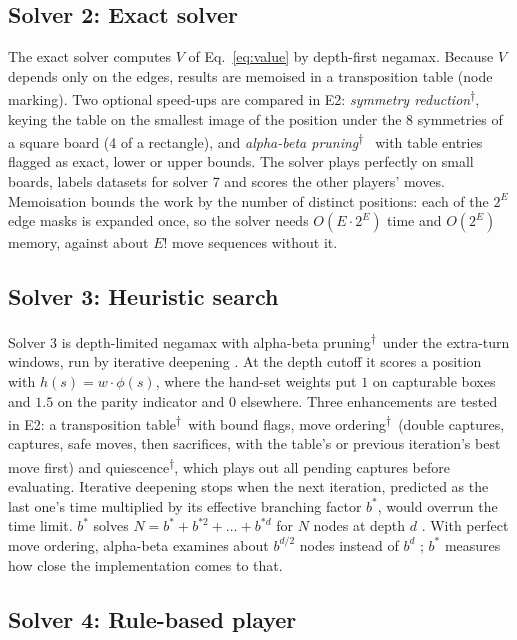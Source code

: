 \documentclass[11pt,a4paper]{article}
\newcommand{\outside}{\textsuperscript{$\dagger$}} %
\begin{document}
\subsection{Solver 2: Exact solver}

The exact solver computes $V$ of Eq.~\eqref{eq:value} by depth-first negamax. Because $V$
depends only on the edges, results are memoised in a transposition table (node marking).
Two optional speed-ups are compared in E2: \emph{symmetry reduction}\outside, keying the
table on the smallest image of the position under the 8 symmetries of a square board (4
of a rectangle), and \emph{alpha-beta pruning}\outside\ \cite{knuth1975alphabeta} with
table entries flagged as exact, lower or upper bounds. The solver plays perfectly on
small boards, labels datasets for solver 7 and scores the other players' moves.
Memoisation bounds the work by the number of distinct positions: each of the $2^E$ edge
masks is expanded once, so the solver needs $O(E\cdot 2^E)$ time and $O(2^E)$ memory,
against about $E!$ move sequences without it.

\subsection{Solver 3: Heuristic search}

Solver 3 is depth-limited negamax with alpha-beta pruning\outside\ under the extra-turn
windows, run by iterative deepening \cite{korf1985iddfs}. At the depth cutoff it scores
a position with $h(s)=w\cdot\phi(s)$, where the hand-set weights put $1$ on capturable
boxes and $1.5$ on the parity indicator and $0$ elsewhere. Three enhancements are tested
in E2: a transposition table\outside\ with bound flags, move ordering\outside\ (double
captures, captures, safe moves, then sacrifices, with the table's or previous
iteration's best move first) and quiescence\outside, which plays out all pending captures
before evaluating. Iterative deepening stops when the next iteration, predicted as the
last one's time multiplied by its effective branching factor $b^*$, would overrun the
time limit. $b^*$ solves $N=b^*+b^{*2}+\dots+b^{*d}$ for $N$ nodes at depth $d$
\cite{csd311notes}. With perfect move ordering, alpha-beta examines about $b^{d/2}$ nodes
instead of $b^d$ \cite{knuth1975alphabeta}; $b^*$ measures how close the implementation
comes to that.

\subsection{Solver 4: Rule-based player}
\end{document}
